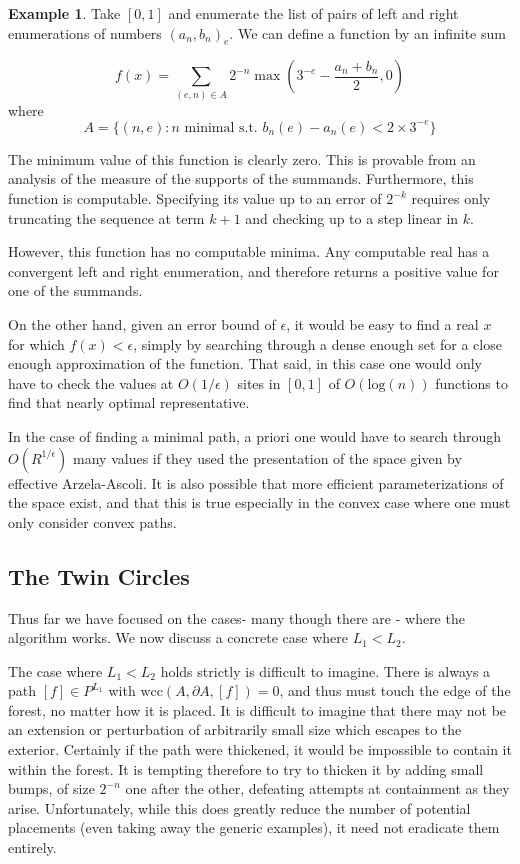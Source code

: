 \documentclass[10pt,a4paper]{article}
\theoremstyle{definition}
\newtheorem{example}[thm]{Example}
\begin{document}
\begin{example}
 Take $[0,1]$ and enumerate the list of pairs of left and right enumerations of numbers $(a_n,b_n)_e$. We can define a function by an infinite sum

$$f(x) = \sum_{(e,n)\in A} 2^{-n}\max\left(3^{-e}-\frac{a_n+b_n}{2},0\right) $$
where 
$$A = \{(n,e) : n \text { minimal s.t. } b_n(e)-a_n(e)< 2\times3^{-e}\}$$

The minimum value of this function is clearly zero. This is provable from an analysis of the measure of the supports of the summands. Furthermore, this function is computable. Specifying its value  up to an error of $2^{-k}$ requires only truncating the sequence at term $k+1$ and checking up to a step linear in $k$.

However, this function has no computable minima. Any computable real has a convergent left and right enumeration, and therefore returns a positive value for one of the summands.

On the other hand, given an error bound of $\epsilon$, it would be easy to find a real $x$ for which $f(x) <\epsilon$, simply by searching through a dense enough set for a close enough approximation of the function. That said, in this case one would only have to check the values at $O(1/\epsilon)$ sites in $[0,1]$  of $O(\mathrm{log}(n))$ functions to find that nearly optimal representative.

\end{example}
\label{example:argmin}

In the case of finding a minimal path, a priori one would have to search through $O(R^{1/\epsilon})$ many values if they used the presentation of the space given by effective Arzela-Ascoli. It is also possible that more efficient parameterizations of the space exist, and that this is true especially in the convex case where one must only consider convex paths.

\subsection{The Twin Circles}
\label{sec:andtwins}
Thus far we have focused on the cases- many though there are - where the algorithm works. We now discuss a concrete case where $L_1 < L_2$.

The case where $L_1 < L_2$ holds strictly is difficult to imagine. There is always a path $[f]\in P^{L_1}$ with $\mathrm{wcc}(A,\partial A, [f]) = 0$, and thus must touch the edge of the forest, no matter how it is placed. It is difficult to imagine that there may not be an extension or perturbation of arbitrarily small size which escapes to the exterior. Certainly if the path were thickened, it would be impossible to contain it within the forest. It is tempting therefore to try to thicken it by adding small bumps, of size $2^{-n}$ one after the other, defeating attempts at containment as they arise. Unfortunately, while this does greatly reduce the number of potential placements (even taking away the generic examples), it need not eradicate them entirely.
\end{document}
